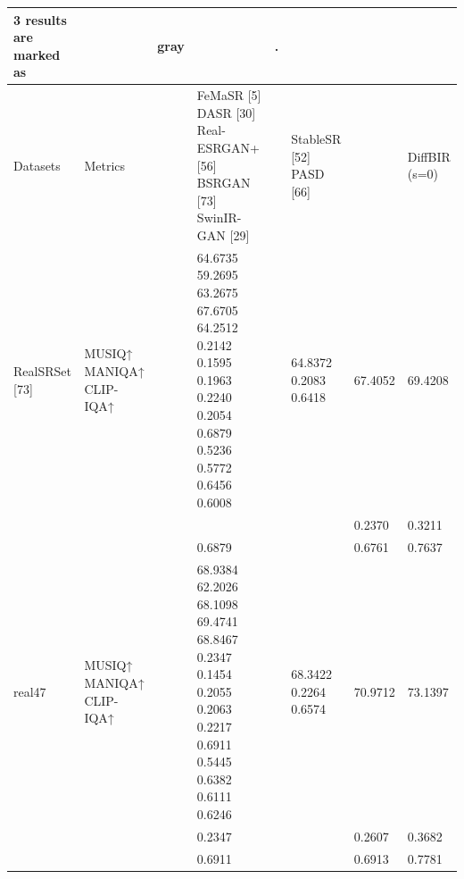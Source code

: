 \begin{tabular}{llllllll}
\toprule
3 results are marked as &  & gray &  & . &  &  &  \\
\midrule
Datasets & Metrics &  & FeMaSR [5] DASR [30] Real-ESRGAN+ [56] BSRGAN [73] SwinIR-GAN [29] &  & StableSR [52] PASD [66] &  & DiffBIR (s=0) \\
RealSRSet [73] & MUSIQ↑ MANIQA↑ CLIP-IQA↑ &  & 64.6735 59.2695 63.2675 67.6705 64.2512 0.2142 0.1595 0.1963 0.2240 0.2054 0.6879 0.5236 0.5772 0.6456 0.6008 &  & 64.8372 0.2083 0.6418 & 67.4052 & 69.4208 \\
 &  &  &  &  &  & 0.2370 & 0.3211 \\
 &  &  & 0.6879 &  &  & 0.6761 & 0.7637 \\
real47 & MUSIQ↑ MANIQA↑ CLIP-IQA↑ &  & 68.9384 62.2026 68.1098 69.4741 68.8467 0.2347 0.1454 0.2055 0.2063 0.2217 0.6911 0.5445 0.6382 0.6111 0.6246 &  & 68.3422 0.2264 0.6574 & 70.9712 & 73.1397 \\
 &  &  & 0.2347 &  &  & 0.2607 & 0.3682 \\
 &  &  & 0.6911 &  &  & 0.6913 & 0.7781 \\
\bottomrule
\end{tabular}
